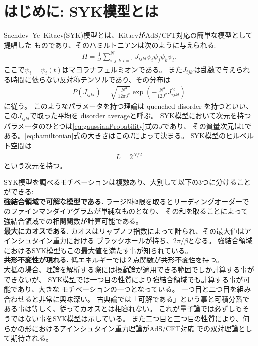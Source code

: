 \section{はじめに: SYK模型とは}
Sachdev--Ye--Kitaev(SYK)模型とは、KitaevがAdS/CFT対応の簡単な模型として提唱した
ものであり、そのハミルトニアンは次のように与えられる:
\begin{align}
  H = \frac{1}{4!}\sum_{i,j,k,l = 1}^{N} J_{ijkl}\psi_i\psi_j\psi_k\psi_l.
  \label{eq:hamiltonian}
\end{align}
ここで$\psi_i = \psi_i(t)$はマヨラナフェルミオンである。
また$J_{ijkl}$は乱数で与えられる時間に依らない反対称テンソルであり、その分布は
\begin{align}
  P(J_{ijkl}) = \sqrt{\frac{N^3}{12\pi J^2}}
                \exp\left(-\frac{N^3}{12J^2}J_{ijkl}^{\, 2}\right)
	\label{eq:gaussianProbability}
\end{align}
に従う。
このようなパラメータを持つ理論は quenched disorder を持つといい、
この$J_{ijkl}$で取った平均を disorder averageと呼ぶ。
SYK模型において次元を持つパラメータのひとつは\eqref{eq:gaussianProbability}式の$J$であり、
その質量次元は1である。\eqref{eq:hamiltonian}式の大きさはこの$J$によって決まる。
SYK模型のヒルベルト空間は
\begin{align}
	L = 2^{N/2}
\end{align}
という次元を持つ。

SYK模型を調べるモチベーションは複数あり、大別して以下の3つに分けることができる:\\

\textbf{強結合領域で可解な模型である.}
ラージN極限を取るとリーディングオーダーでのファインマンダイアグラムが単純なものとなり、
その和を取ることによって強結合領域での相関関数が計算可能である。\\

\textbf{最大にカオスである.}
カオスはリャプノフ指数によって計られ、その最大値はアインシュタイン重力における
ブラックホールが持ち、$2\pi / \beta$となる\cite{shenker}。
強結合領域におけるSYK模型もこの最大値を満たす事が知られている\cite{maldacena}。\\

\textbf{共形不変性が現れる.}
低エネルギーでは２点関数が共形不変性を持つ。\\

大抵の場合、理論を解析する際には摂動論が適用できる範囲でしか計算する事ができないが、
SYK模型では一つ目の性質により強結合領域でも計算する事が可能であり、大きな
モチベーションの一つとなっている。
一つ目と二つ目を組み合わせると非常に興味深い。
古典論では「可解である」という事と可積分系である事は等しく、従ってカオスとは相容れない\cite{polchinski}。
これが量子論では必ずしもそうではない事をSYK模型は示している。
また二つ目と三つ目の性質により、何らかの形におけるアインシュタイン重力理論がAdS/CFT対応
での双対理論として期待される。

